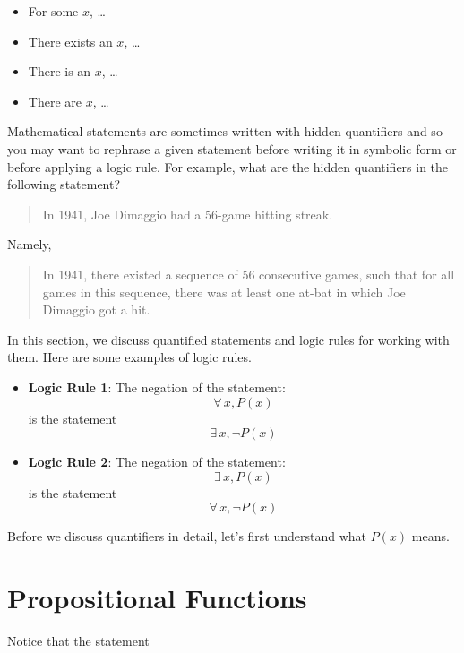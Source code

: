 \documentclass[
  letterpaper,
  10pt,
  reqno,
  twopage,
  openany]{book}
\providecommand{\tightlist}{%
  \setlength{\itemsep}{0pt}\setlength{\parskip}{0pt}}\usepackage{longtable,booktabs,array}
\theoremstyle{plain}
\theoremstyle{definition}
\theoremstyle{definition}
\theoremstyle{definition}
\theoremstyle{plain}
\theoremstyle{plain}
\theoremstyle{remark}
\begin{document}
\begin{itemize}
\tightlist
\item
  For some \(x\), \ldots{}
\item
  There exists an \(x\), \ldots{}\\
\item
  There is an \(x\), \ldots{}\\
\item
  There are \(x\), \ldots{}
\end{itemize}

Mathematical statements are sometimes written with hidden quantifiers
and so you may want to rephrase a given statement before writing it in
symbolic form or before applying a logic rule. For example, what are the
hidden quantifiers in the following statement?

\begin{quote}
In 1941, Joe Dimaggio had a 56-game hitting streak.
\end{quote}

Namely,

\begin{quote}
In 1941, there existed a sequence of 56 consecutive games, such that for
all games in this sequence, there was at least one at-bat in which Joe
Dimaggio got a hit.
\end{quote}

In this section, we discuss quantified statements and logic rules for
working with them. Here are some examples of logic rules.

\begin{itemize}
\item
  \textbf{Logic Rule 1}: The negation of the statement: \[
  \forall \, x, P(x)
  \] is the statement \[
  \exists \, x, \neg P(x)
  \]
\item
  \textbf{Logic Rule 2}: The negation of the statement:\\
  \[
  \exists \, x, P(x)
  \] is the statement \[
  \forall \, x, \neg P(x)
  \]
\end{itemize}

Before we discuss quantifiers in detail, let's first understand what
\(P(x)\) means.

\hypertarget{propositional-functions}{%
\section{Propositional Functions}\label{propositional-functions}}

Notice that the statement
\end{document}
